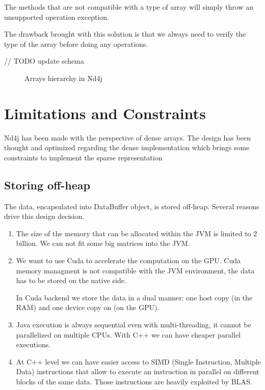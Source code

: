 The methods that are not compatible with a type of array will simply throw an unsupported operation exception.

The drawback brought with this solution is that we always need to verify the type of the array before doing any operations.

// TODO update schema
 
\begin{figure}[H]
	\begin{center}
		\label{fig:hierarchy}
		\caption{Arrays hierarchy in Nd4j}
	\end{center}
\end{figure}


\section{Limitations and Constraints}

Nd4j has been made with the perspective of dense arrays. The design has been thought and optimized regarding the dense implementation which brings some constraints to implement the sparse representation
\subsection{Storing off-heap}

The data, encapsulated into DataBuffer object, is stored off-heap. Several reasons drive this design decision.
\begin{enumerate}
	\item The size of the memory that can be allocated within the JVM is limited to 2 billion. We can not fit some big matrices into the JVM.
	\item We want to use Cuda to accelerate the computation on the GPU. Cuda memory managment is not compatible with the JVM environment, the data has to be stored on the native side.
	
	In Cuda backend we store the data in a dual manner: one host copy (in the RAM) and one device copy on (on the GPU).
	
	\item Java execution is always sequential even with multi-threading, it cannot be parallelized on multiple CPUs. With C++ we can have cheaper parallel executions.
	\item At C++ level we can have easier access to SIMD (Single Instruction, Multiple Data) instructions that allow to execute an instruction in parallel on different blocks of the same data. Those instructions are heavily exploited by BLAS.
\end{enumerate}

